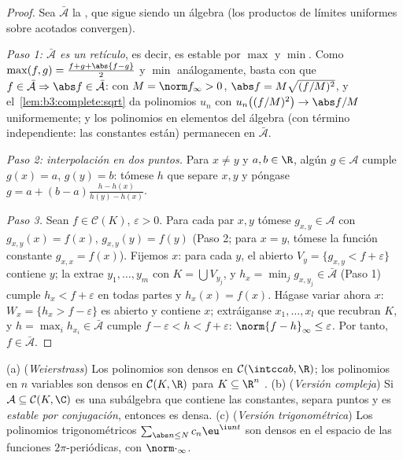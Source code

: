 \begin{proof}
Sea $\bar{\mathcal A}$ la ,
que sigue siendo un álgebra (los productos de límites uniformes sobre
acotados convergen).

\emph{Paso 1: $\bar{\mathcal A}$ es un retículo}, es decir, es estable
por $\max$ y $\min$. Como $\max(f,g) = \frac{f + g +
\abs{f-g}}2$ y $\min$ análogamente, basta con que $f \in
\bar{\mathcal A} \Rightarrow \abs f \in \bar{\mathcal A}$: con
$M = \norm f_\infty > 0$, $\abs f = M\sqrt{(f/M)^2}$, y
el~\cref{lem:b3:complete:sqrt} da polinomios $u_n$ con
$u_n\bigl((f/M)^2\bigr) \to \abs f/M$ uniformemente; y los polinomios en
elementos del álgebra (con término independiente: las constantes están)
permanecen en $\bar{\mathcal A}$.

\emph{Paso 2: interpolación en dos puntos.} Para $x \neq y$ y $a,
b \in \R$, algún $g \in \mathcal A$ cumple $g(x) = a$, $g(y) = b$:
tómese $h$ que separe $x, y$ y póngase $g = a + (b -
a)\frac{h - h(x)}{h(y) - h(x)}$.

\emph{Paso 3.} Sean $f \in \mathcal C(K)$, $\varepsilon > 0$. Para cada
par $x, y$ tómese $g_{x,y} \in \mathcal A$ con $g_{x,y}(x) = f(x)$,
$g_{x,y}(y) = f(y)$ (Paso 2; para $x = y$, tómese la función constante
$g_{x,x} = f(x)$). Fijemos $x$: para cada $y$, el
abierto $V_y = \{g_{x,y} < f +
\varepsilon\}$ contiene $y$; la  extrae $y_1, \dots,
y_m$ con $K = \bigcup V_{y_j}$, y $h_x = \min_j g_{x, y_j}
\in \bar{\mathcal A}$ (Paso 1) cumple $h_x < f +
\varepsilon$ en todas partes y $h_x(x) = f(x)$. Hágase variar ahora $x$:
$W_x =
\{h_x > f - \varepsilon\}$ es abierto y contiene $x$; extráiganse $x_1,
\dots, x_l$ que recubran $K$, y $h = \max_i h_{x_i} \in
\bar{\mathcal A}$ cumple $f - \varepsilon < h < f +
\varepsilon$: $\norm{f - h}_\infty \leq \varepsilon$. Por tanto,
$f \in \bar{\mathcal A}$.
\end{proof}

\begin{corollary}\label{cor:b3:complete:weierstrass}
(a) (\emph{Weierstrass}) Los polinomios son densos en $\mathcal
C(\intcc ab, \R)$; los polinomios en $n$ variables son densos en
$\mathcal C(K, \R)$ para $K \subseteq \R^n$
. (b) (\emph{Versión
compleja}) Si $\mathcal A \subseteq \mathcal
C(K, \C)$ es una subálgebra que contiene las constantes, separa puntos y
es \emph{estable por conjugación}, entonces es densa. (c) (\emph{Versión
trigonométrica}) Los polinomios trigonométricos
$\sum_{\abs n \leq N}c_n\eu^{\iu n t}$ son densos en el espacio de las
funciones 
$2\pi$-periódicas, con $\norm\cdot_\infty$.
\end{corollary}

